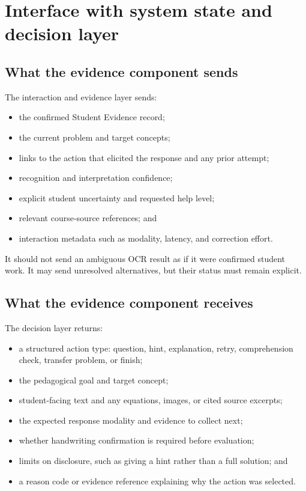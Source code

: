 \documentclass[11pt]{article}
\begin{document}
\section{Interface with system state and decision layer}

\subsection{What the evidence component sends}

The interaction and evidence layer sends:

\begin{itemize}
    \item the confirmed Student Evidence record;
    \item the current problem and target concepts;
    \item links to the action that elicited the response and any prior attempt;
    \item recognition and interpretation confidence;
    \item explicit student uncertainty and requested help level;
    \item relevant course-source references; and
    \item interaction metadata such as modality, latency, and correction effort.
\end{itemize}

It should not send an ambiguous OCR result as if it were confirmed student work. It may send unresolved alternatives, but their status must remain explicit.

\subsection{What the evidence component receives}

The decision layer returns:

\begin{itemize}
    \item a structured action type: question, hint, explanation, retry, comprehension check, transfer problem, or finish;
    \item the pedagogical goal and target concept;
    \item student-facing text and any equations, images, or cited source excerpts;
    \item the expected response modality and evidence to collect next;
    \item whether handwriting confirmation is required before evaluation;
    \item limits on disclosure, such as giving a hint rather than a full solution; and
    \item a reason code or evidence reference explaining why the action was selected.
\end{itemize}
\end{document}
